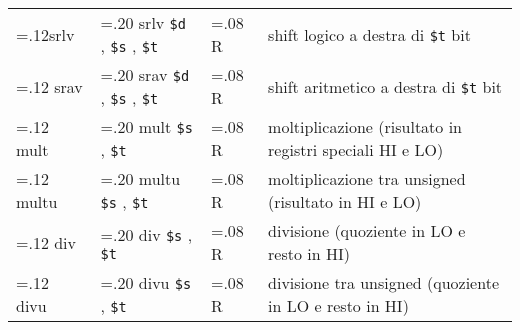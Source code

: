 \documentclass{standalone}
\newcommand\lightrule{%
	\arrayrulecolor{black!30}%
	\midrule[\lightrulewidth]%
	\arrayrulecolor{black}}
\newcommand\register[1]{%
	\texttt{#1}%
}
\begin{document}
\begin{tabularx}{\textwidth}{ >{\hsize=.12\textwidth}X >{\hsize=.20\textwidth}X >{\hsize=.08\textwidth}X X }
		srlv & srlv \register{\$d}, \register{\$s}, \register{\$t} & R & shift logico a destra di \register{\$t} bit \\\lightrule
		srav & srav \register{\$d}, \register{\$s}, \register{\$t} & R & shift aritmetico a destra di \register{\$t} bit \\\lightrule
		mult & mult \register{\$s}, \register{\$t} & R & moltiplicazione (risultato in registri speciali HI e LO) \\\lightrule
		multu & multu \register{\$s}, \register{\$t} & R & moltiplicazione tra unsigned (risultato in HI e LO) \\\lightrule
		div & div \register{\$s}, \register{\$t} & R & divisione (quoziente in LO e resto in HI) \\\lightrule
		divu & divu \register{\$s}, \register{\$t} & R & divisione tra unsigned (quoziente in LO e resto in HI) \\
	\bottomrule
\end{tabularx}
\end{document}
